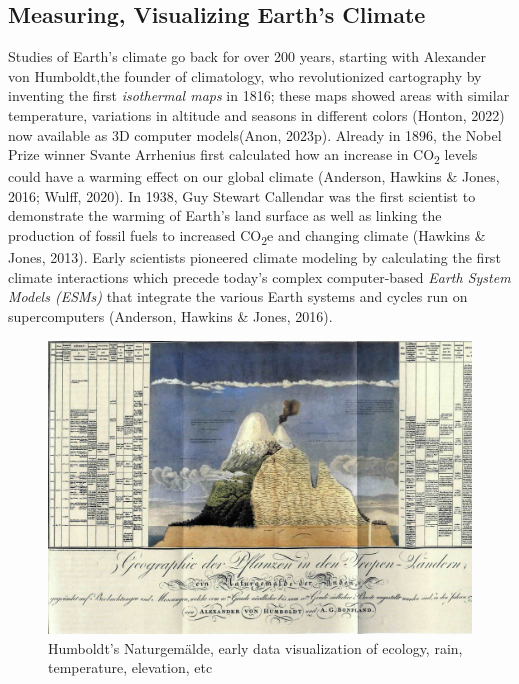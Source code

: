 \documentclass[
  letterpaper,
  DIV=11,
  numbers=noendperiod]{scrartcl}
\begin{document}
\subsection{Measuring, Visualizing Earth's
Climate}\label{measuring-visualizing-earths-climate}

Studies of Earth's climate go back for over 200 years, starting with
Alexander von Humboldt,the founder of climatology, who revolutionized
cartography by inventing the first \emph{isothermal maps} in 1816; these
maps showed areas with similar temperature, variations in altitude and
seasons in different colors (Honton, 2022) now available as 3D computer
models(Anon, 2023p). Already in 1896, the Nobel Prize winner Svante
Arrhenius first calculated how an increase in CO\textsubscript{2} levels
could have a warming effect on our global climate (Anderson, Hawkins \&
Jones, 2016; Wulff, 2020). In 1938, Guy Stewart Callendar was the first
scientist to demonstrate the warming of Earth's land surface as well as
linking the production of fossil fuels to increased CO\textsubscript{2}e
and changing climate (Hawkins \& Jones, 2013). Early scientists
pioneered climate modeling by calculating the first climate interactions
which precede today's complex computer-based \emph{Earth System Models
(ESMs)} that integrate the various Earth systems and cycles run on
supercomputers (Anderson, Hawkins \& Jones, 2016).

\begin{figure}[H]

{\centering \includegraphics[width=1\textwidth,height=\textheight]{./images/sustainability/humboldt.jpg}

}

\caption{Humboldt's Naturgemälde, early data visualization of ecology,
rain, temperature, elevation, etc}

\end{figure}%
\end{document}
